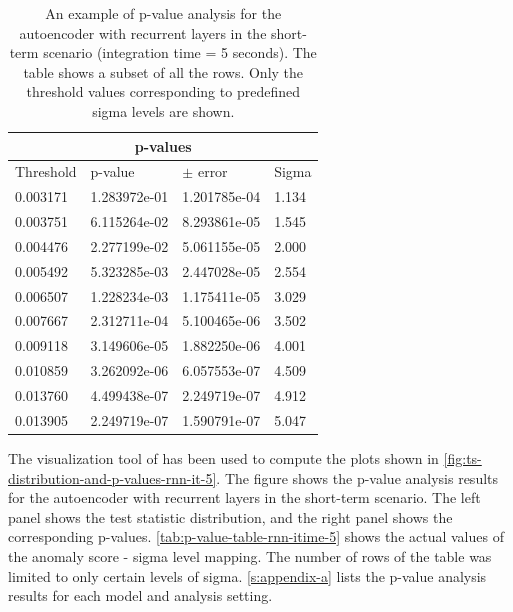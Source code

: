 \begin{table}[!htb]
\centering
\begin{tabular}{|p{3cm}|p{3cm}|p{3cm}|p{3cm}|}
\hline
\multicolumn{4}{|c|}{p-values} \\
\hline
Threshold & p-value & $\pm$ error &  Sigma \\
\hline
0.003171 &  1.283972e-01 &  1.201785e-04 &  1.134 \\
0.003751 &  6.115264e-02 &  8.293861e-05 &  1.545 \\
0.004476 &  2.277199e-02 &  5.061155e-05 &  2.000 \\
0.005492 &  5.323285e-03 &  2.447028e-05 &  2.554 \\
0.006507 &  1.228234e-03 &  1.175411e-05 &  3.029 \\
0.007667 &  2.312711e-04 &  5.100465e-06 &  3.502 \\
0.009118 &  3.149606e-05 &  1.882250e-06 &  4.001 \\
0.010859 &  3.262092e-06 &  6.057553e-07 &  4.509 \\
0.013760 &  4.499438e-07 &  2.249719e-07 &  4.912 \\
0.013905 &  2.249719e-07 &  1.590791e-07 &  5.047 \\
\hline
\end{tabular}
\caption{An example of p-value analysis for the autoencoder with recurrent layers in the short-term scenario (integration time = 5 seconds). The table shows a subset of all the rows. Only the threshold values corresponding to predefined sigma levels are shown.}
\label{tab:p-value-table-rnn-itime-5}
\end{table}
The visualization tool of \cite{dipiano2022ctasagsci} has been used to compute the plots shown in \autoref{fig:ts-distribution-and-p-values-rnn-it-5}. The figure shows the p-value analysis results for the autoencoder with recurrent layers in the short-term scenario. The left panel  shows the test statistic distribution, and the right panel shows the corresponding p-values. \autoref{tab:p-value-table-rnn-itime-5} shows the actual values of the anomaly score - sigma level mapping. The number of rows of the table was limited to only certain levels of sigma. \autoref{s:appendix-a} lists the p-value analysis results for each model and analysis setting. 

 


